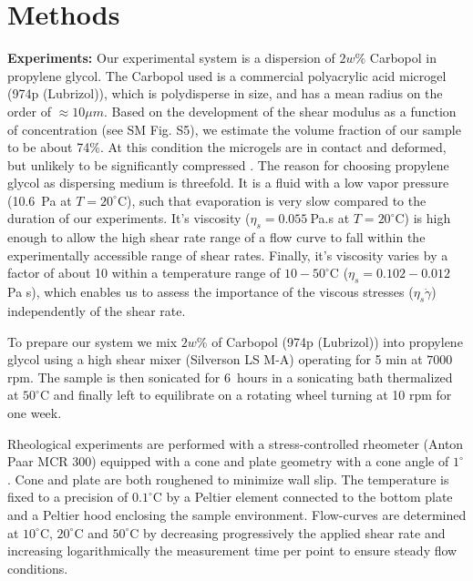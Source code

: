 \documentclass[%
preprint,
 amsmath,amssymb,
 aps,
]{revtex4-1}
\begin{document}
{{%

\section{Methods}
\textbf{Experiments:} Our experimental system is a dispersion of $2 w \%$ Carbopol in propylene glycol. The Carbopol used is a  commercial polyacrylic acid microgel (974p (Lubrizol)), which is polydisperse in size, and has a mean radius on the order of $\approx10\mu m$. Based on the development of the shear modulus as a function of concentration (see SM Fig. S5), we estimate the volume fraction of our sample to be about 74\%. At this condition the microgels are in contact and deformed, but unlikely to be significantly compressed \cite{conley2017jamming,conley2019relationship}. 
The reason for choosing propylene glycol as dispersing medium is threefold. It is a fluid with a low vapor pressure (10.6~Pa at $T=20^{\circ}$C), such that evaporation is very slow compared to the duration of our experiments. It's viscosity ($\eta_s = 0.055~$Pa.s at $T=20^{\circ}$C) is high enough to allow the high shear rate range of a flow curve to fall within the experimentally accessible range of shear rates. Finally, it's viscosity varies by a factor of about 10 within a temperature range of $10-50^{\circ}$C ($\eta_s = 0.102-0.012$ Pa s), which enables us to assess the importance of the viscous stresses ($\eta_s \dot{\gamma}$) independently of the shear rate.

To prepare our system we mix $2 w \%$ of Carbopol (974p (Lubrizol)) into propylene glycol using a high shear mixer (Silverson LS M-A) operating for 5 min at $7000$rpm. The sample is then sonicated for $6$ hours in a sonicating bath thermalized at $50^{\circ}$C and finally left to equilibrate on a rotating wheel turning at 10 rpm for one week.

Rheological experiments are performed with a stress-controlled rheometer (Anton Paar MCR $300$) equipped with a cone and plate geometry with a cone angle of $1^{\circ}$. Cone and plate are both roughened to minimize wall slip. The temperature is fixed to a precision of $0.1^{\circ}$C by a Peltier element connected to the bottom plate and a Peltier hood enclosing the sample environment. Flow-curves are determined at $10^{\circ}$C, $20^{\circ}$C and $50^{\circ}$C by decreasing progressively the applied shear rate and increasing logarithmically the measurement time per point to ensure steady flow conditions.

}}
\end{document}
